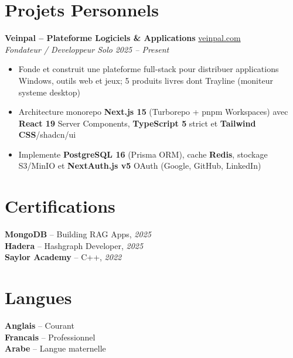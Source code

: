\documentclass[10pt,a4paper]{article}
\begin{document}
\vspace{4pt}
\section*{Projets Personnels}
{\small
\textbf{Veinpal -- Plateforme Logiciels \& Applications} \hfill \href{https://veinpal.com}{veinpal.com}\\[1pt]
\textit{Fondateur / Developpeur Solo} \hfill \textit{2025 -- Present}
\begin{itemize}
  \item Fonde et construit une plateforme full-stack pour distribuer applications Windows, outils web et jeux; 5 produits livres dont Trayline (moniteur systeme desktop)
  \item Architecture monorepo \textbf{Next.js 15} (Turborepo + pnpm Workspaces) avec \textbf{React 19} Server Components, \textbf{TypeScript 5} strict et \textbf{Tailwind CSS}/shadcn/ui
  \item Implemente \textbf{PostgreSQL 16} (Prisma ORM), cache \textbf{Redis}, stockage S3/MinIO et \textbf{NextAuth.js v5} OAuth (Google, GitHub, LinkedIn)
\end{itemize}


}

\vspace{3pt}
\section*{Certifications}
{\small
\textbf{MongoDB} -- Building RAG Apps, \textit{2025}\\[1pt]
\textbf{Hadera} -- Hashgraph Developer, \textit{2025}\\[1pt]
\textbf{Saylor Academy} -- C++, \textit{2022}
}

\section*{Langues}
{\small
\textbf{Anglais} -- Courant\\[1pt]
\textbf{Francais} -- Professionnel\\[1pt]
\textbf{Arabe} -- Langue maternelle
}
\end{document}

